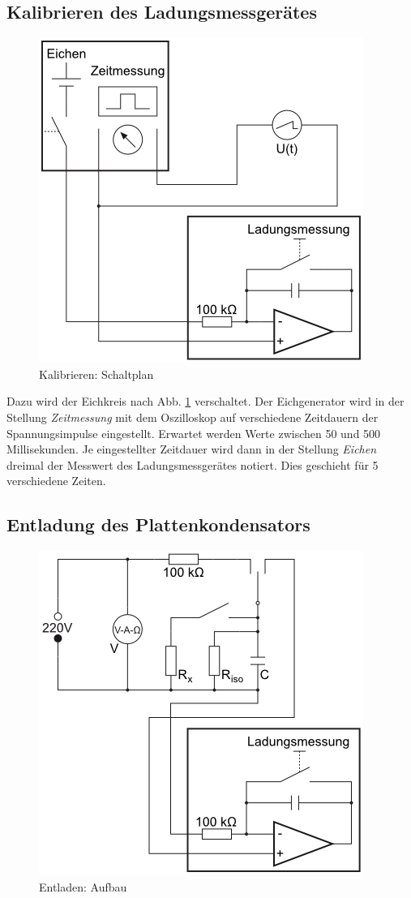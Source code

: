 \documentclass[12pt,a4paper,titlepage,headinclude,bibtotoc]{scrartcl}
\begin{document}
\subsection{Kalibrieren des Ladungsmessgerätes}
\begin{figure}[!htb]
	\centering
	\includegraphics[scale=1.0]{Eichen.png}
	\caption{Kalibrieren: Schaltplan}
	\label{fig:Eichkreis}
\end{figure}

Dazu wird der Eichkreis nach Abb. \ref{fig:Eichkreis} verschaltet.
Der Eichgenerator wird in der Stellung \emph{Zeitmessung} mit dem Oszilloskop auf verschiedene Zeitdauern der Spannungsimpulse eingestellt.
Erwartet werden Werte zwischen 50 und 500 Millisekunden.
Je eingestellter Zeitdauer wird dann in der Stellung \emph{Eichen} dreimal der Messwert des Ladungsmessgerätes notiert.
Dies geschieht für 5 verschiedene Zeiten.

\subsection{Entladung des Plattenkondensators}
\begin{figure}[!htb]
	\centering
	\includegraphics[scale=1.0]{Entladen.png}
	\caption{Entladen: Aufbau}
	\label{fig:Entladen}
\end{figure}
\end{document}
